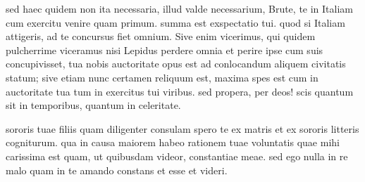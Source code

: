  sed haec quidem non ita necessaria, illud valde necessarium, Brute, te in Italiam cum exercitu venire quam primum. summa est exspectatio tui. quod si Italiam attigeris, ad te concursus fiet omnium. Sive enim vicerimus, qui quidem pulcherrime viceramus nisi Lepidus perdere omnia et perire ipse cum suis concupivisset, tua nobis auctoritate opus est ad conlocandum aliquem civitatis statum; sive etiam nunc certamen reliquum est, maxima spes est cum in auctoritate tua tum in exercitus tui viribus. sed propera, per deos! scis quantum sit in temporibus, quantum in celeritate.

 sororis tuae filiis quam diligenter consulam spero te ex matris et ex sororis litteris cogniturum. qua in causa maiorem habeo rationem tuae voluntatis quae mihi carissima est quam, ut quibusdam videor, constantiae meae. sed ego nulla in re malo quam in te amando constans et esse et videri.
